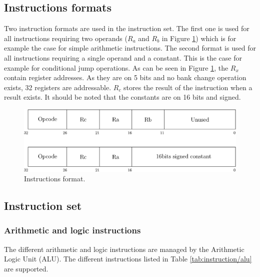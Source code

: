\subsection{Instructions formats}

Two instruction formats are used in the instruction set.  The first one is used for all instructions 
requiring two operands ($R_a$ and $R_b$ in Figure \ref{fig:instructions/format}) which is for example 
the case for simple arithmetic instructions. The second format is used for all instructions 
requiring a single operand and a constant. This is the case for example for conditional jump 
operations. As can be seen in Figure \ref{fig:instructions/format}, the $R_x$ contain register 
addresses. As they are on 5 bits and no bank change operation exists, 32 registers are addressable. 
$R_c$ stores the result of the instruction when a result exists. It should be noted that the 
constants are on 16 bits and signed.

\begin{figure}[H]
    \centering
    \includegraphics[scale=0.6]{Chapter3-CPU/res/instruction}
    \caption{Instructions format.}
    \label{fig:instructions/format}
\end{figure}

\subsection{Instruction set}

\subsubsection*{Arithmetic and logic instructions}

The different arithmetic and logic instructions are managed by the Arithmetic Logic Unit (ALU). The 
different instructions listed in Table \ref{tab:instruction/alu} are supported.

